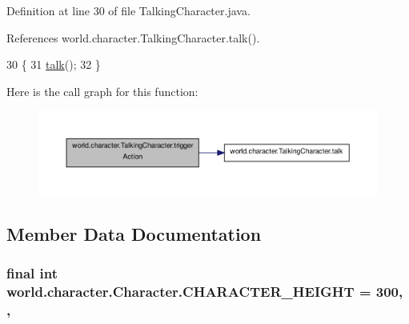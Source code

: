 Definition at line 30 of file Talking\-Character.\-java.



References world.\-character.\-Talking\-Character.\-talk().


\begin{DoxyCode}
30                                 \{
31         \hyperlink{classworld_1_1character_1_1_talking_character_ac38a9c3d5a62edc8e8ae776410c834af}{talk}();
32     \}
\end{DoxyCode}


Here is the call graph for this function\-:\nopagebreak
\begin{figure}[H]
\begin{center}
\leavevmode
\includegraphics[width=350pt]{classworld_1_1character_1_1_talking_character_a880e0de97bfae094b3d25a12c055cad2_cgraph}
\end{center}
\end{figure}




\subsection{Member Data Documentation}
\hypertarget{classworld_1_1character_1_1_character_a31596c03022d61aeb8aac56f149309be}{
\subsubsection[{C\-H\-A\-R\-A\-C\-T\-E\-R\-\_\-\-H\-E\-I\-G\-H\-T}]{\setlength{\rightskip}{0pt plus 5cm}final int world.\-character.\-Character.\-C\-H\-A\-R\-A\-C\-T\-E\-R\-\_\-\-H\-E\-I\-G\-H\-T = 300\hspace{0.3cm}{\ttfamily [static]}, {\ttfamily [protected]}, {\ttfamily [inherited]}}}\label{classworld_1_1character_1_1_character_a31596c03022d61aeb8aac56f149309be}


